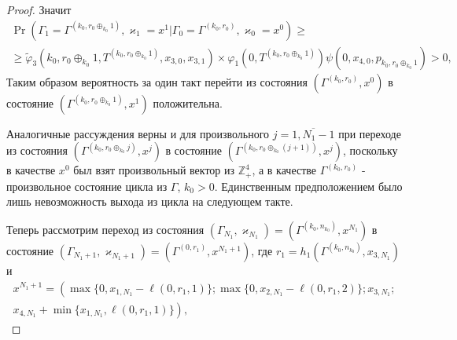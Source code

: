 \documentclass[a4paper,12pt,russian]{extarticle}
\begin{document}
\begin{proof}
Значит
\begin{multline*}
\Pr (\Gamma_{1}=\Gamma^{(k_0,r_0\oplus_{k_0}1)},\varkappa_{1}=x^1 | \Gamma_{0}=\Gamma^{(k_0,r_0)},\varkappa_0=x^0)\geqslant \\
\geqslant \widetilde{\varphi}_3(k_0,r_0\oplus_{k_0}1,T^{(k_0,r_0\oplus_{k_0}1)},x_{3,0},x_{3,1})
\times
\varphi_1(0,T^{(k_0,r_0\oplus_{k_0}1)})  \psi(0,x_{4,0}, p_{k_0,r_0\oplus_{k_0}1}) > 0,
\end{multline*}
Таким образом вероятность за один такт перейти из состояния $(\Gamma^{(k_0,r_0)}, x^0)$ в состояние $ (\Gamma^{(k_0,r_0\oplus_{k_0}1)}, x^1)$ положительна.

Аналогичные рассуждения верны и для произвольного $j=\overline{1,N_1-1}$
при переходе из состояния $(\Gamma^{(k_0,r_0\oplus_{k_0} j)},x^j)$ в состояние $(\Gamma^{(k_0,r_0\oplus_{k_0}(j+1))},x^j)$, поскольку в качестве $x^0$ был взят произвольный вектор из $\mathbb{Z}_+^4$, а в качестве $\Gamma^{(k_0,r_0)}$ - произвольное состояние цикла из $\Gamma$, $k_0>0$. Единственным предположением было лишь невозможность выхода из цикла на следующем такте.

Теперь рассмотрим переход из состояния $(\Gamma_{N_1},\varkappa_{N_1}) = (\Gamma^{(k_0,n_{k_0})},x^{N_1})$ в состояние $(\Gamma_{N_1+1},\varkappa_{N_1+1}) = (\Gamma^{(0,r_1)},x^{N_1+1})$, где $r_1 = h_1(\Gamma^{(k_0,n_{k_0})},x_{3,N_1})$ и 
\begin{multline*}
x^{N_1+1}=\left(\max{\{0,x_{1,N_1} - \ell(0,r_1,1)\}};
\max{\{0,x_{2,N_1} - \ell(0,r_1,2)\}};x_{3,N_1};\right.\\
\left.
x_{4,N_1} + \min{\{x_{1,N_1}, \ell(0,r_1,1)\}}\right),
\end{multline*}


\end{proof}
\end{document}
